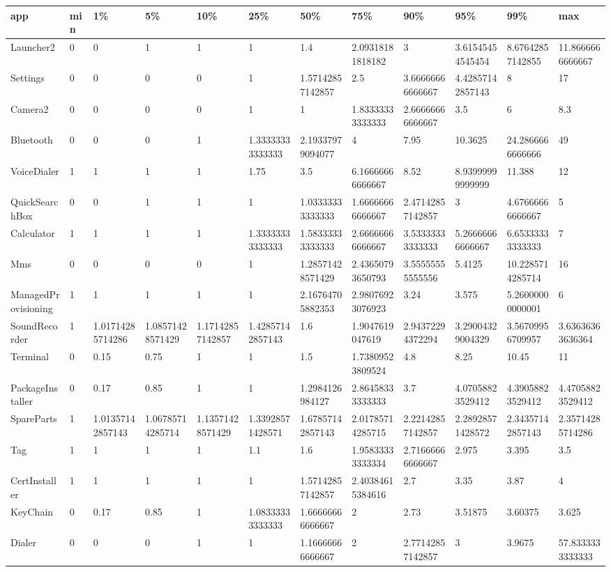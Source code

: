 \documentclass[a4paper]{article}
\begin{document}
\begin{tabular}{|l|l|l|l|l|l|l|l|l|l|l|l|}
\hline
app&min&1\%&5\%&10\%&25\%&50\%&75\%&90\%&95\%&99\%&max\\
\hline
Launcher2&0&0&1&1&1&1.4&2.09318181818182&3&3.61545454545454&8.67642857142855&11.8666666666667\\
\hline
Settings&0&0&0&0&1&1.57142857142857&2.5&3.66666666666667&4.42857142857143&8&17\\
\hline
Camera2&0&0&0&0&1&1&1.83333333333333&2.66666666666667&3.5&6&8.3\\
\hline
Bluetooth&0&0&0&1&1.33333333333333&2.19337979094077&4&7.95&10.3625&24.2866666666666&49\\
\hline
VoiceDialer&1&1&1&1&1.75&3.5&6.16666666666667&8.52&8.93999999999999&11.388&12\\
\hline
QuickSearchBox&0&0&1&1&1&1.03333333333333&1.66666666666667&2.47142857142857&3&4.67666666666667&5\\
\hline
Calculator&1&1&1&1&1.33333333333333&1.58333333333333&2.66666666666667&3.53333333333333&5.26666666666667&6.65333333333333&7\\
\hline
Mms&0&0&0&0&1&1.28571428571429&2.43650793650793&3.55555555555556&5.4125&10.2285714285714&16\\
\hline
ManagedProvisioning&1&1&1&1&1&2.16764705882353&2.98076923076923&3.24&3.575&5.26000000000001&6\\
\hline
SoundRecorder&1&1.01714285714286&1.08571428571429&1.17142857142857&1.42857142857143&1.6&1.9047619047619&2.94372294372294&3.29004329004329&3.56709956709957&3.63636363636364\\
\hline
Terminal&0&0.15&0.75&1&1&1.5&1.73809523809524&4.8&8.25&10.45&11\\
\hline
PackageInstaller&0&0.17&0.85&1&1&1.2984126984127&2.86458333333333&3.7&4.07058823529412&4.39058823529412&4.47058823529412\\
\hline
SpareParts&1&1.01357142857143&1.06785714285714&1.13571428571429&1.33928571428571&1.67857142857143&2.01785714285715&2.22142857142857&2.28928571428572&2.34357142857143&2.35714285714286\\
\hline
Tag&1&1&1&1&1.1&1.6&1.95833333333334&2.71666666666667&2.975&3.395&3.5\\
\hline
CertInstaller&1&1&1&1&1&1.57142857142857&2.40384615384616&2.7&3.35&3.87&4\\
\hline
KeyChain&0&0.17&0.85&1&1.08333333333333&1.66666666666667&2&2.73&3.51875&3.60375&3.625\\
\hline
Dialer&0&0&0&1&1&1.16666666666667&2&2.77142857142857&3&3.9675&57.8333333333333\\

\end{tabular}
\end{document}
